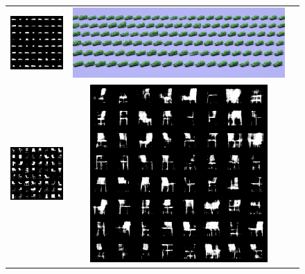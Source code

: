 \begin{figure}[h!]
\begin{center}
\begin{tabular}{ccc}
    \includegraphics[height=\fh]{prgan/fig/car/600.png} & 
    \includegraphics[height=\fh]{prgan/fig/car/output.png} \\
    \includegraphics[height=\fh]{prgan/fig/chair/samples.png} & 
    \includegraphics[height=\fh]{prgan/fig/chair/550.png} & 

\end{tabular}
\end{center}
\end{figure}
